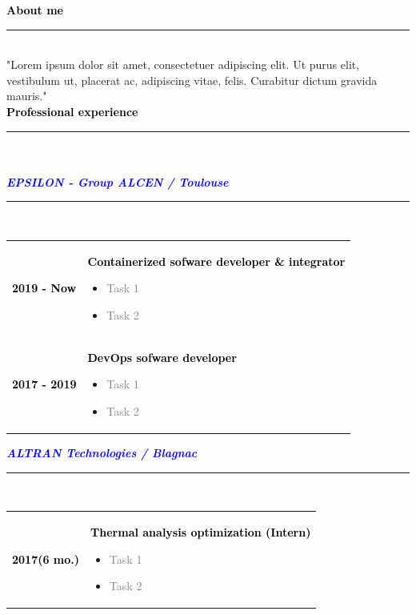 \documentclass[12pt,A4]{article}
\begin{document}
\begin{minipage}[t]{0.68\textwidth}
%
%
\textcolor{black}{\large \bf About me \vspace{-5pt}\\}
\noindent\textcolor{blue}{\rule{13cm}{.8mm}}\\
%
\hspace*{5mm}"Lorem ipsum dolor sit amet, consectetuer adipiscing elit. Ut purus elit,
vestibulum ut, placerat ac, adipiscing vitae, felis. Curabitur dictum
gravida mauris."
%
%
\vspace*{1cm}\\
\textcolor{black}{\large \bf Professional experience \vspace{-5pt}\\}
\noindent\textcolor{blue}{\rule{13cm}{.8mm}}\\
%
\vspace*{-5pt}\\
\textcolor{blue}{\bf \textit{EPSILON - Group ALCEN / Toulouse}}\hfill\textcolor{gray!40}{\rule{5cm}{2mm}}\\
\begin{tabular}{P{2.5cm}p{10cm}}
\textcolor{black}{\bf 2019 - Now} & \textcolor{black}{\bf Containerized sofware developer \& integrator}
\begin{itemize}
  \item \small \textcolor{gray}{Task 1}
  \item \small \textcolor{gray}{Task 2}
\end{itemize}\\
\textcolor{black}{\bf 2017 - 2019} & \textcolor{black}{\bf DevOps sofware developer}
\begin{itemize}
  \item \small \textcolor{gray}{Task 1}
  \item \small \textcolor{gray}{Task 2}
\end{itemize}\\
\end{tabular}
\textcolor{blue}{\bf \textit{ALTRAN Technologies / Blagnac}}\hfill\textcolor{gray!40}{\rule{5cm}{2mm}}\\
\begin{tabular}{P{2.5cm}p{10cm}}
\textcolor{black}{\bf 2017(6 mo.)} & \textcolor{black}{\bf Thermal analysis optimization (Intern)}
\begin{itemize}
  \item \small \textcolor{gray}{Task 1}
  \item \small \textcolor{gray}{Task 2}

\end{itemize}
\end{tabular}
\end{minipage}
\end{document}
